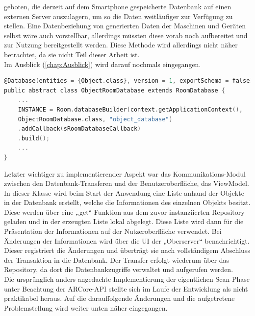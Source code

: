 geboten, die derzeit auf dem Smartphone gespeicherte Datenbank auf einen externen Server auszulagern, um so die Daten weitläufiger zur Verfügung zu stellen. 
Eine Datenbeziehung von generierten Daten der Maschinen und Geräten selbst wäre auch vorstellbar, allerdings müssten diese vorab noch aufbereitet 
und zur Nutzung bereitgestellt werden. Diese Methode wird allerdings nicht näher betrachtet, da sie nicht Teil dieser Arbeit ist. 
\\ 
Im Ausblick (\ref{chap:Ausblick}) wird darauf nochmals eingegangen.
\\ 
\linebreak
\begin{lstlisting}[language=C,
    frame=lines,           % Ein Rahmen um den Code (single for box, lines for top and bottom)
    xleftmargin=\parindent,  % Rahmen link von den Zahlen
    style=algoBericht,
    label={code:dblayer},
    captionpos=b,           % Caption unter den Code setzen
caption={Erzeugung des Datenbank-Layers „Room“}]
@Database(entities = {Object.class}, version = 1, exportSchema = false)
public abstract class ObjectRoomDatabase extends RoomDatabase {
    ...
    INSTANCE = Room.databaseBuilder(context.getApplicationContext(),
    ObjectRoomDatabase.class, "object_database")
    .addCallback(sRoomDatabaseCallback)
    .build();
    ...
}
\end{lstlisting}
Letzter wichtiger zu implementierender Aspekt war das Kommunikations-Modul zwischen den Datenbank-Transferen und der Benutzeroberfläche, das ViewModel. 
In dieser Klasse wird beim Start der Anwendung eine Liste anhand der Objekte in der Datenbank erstellt, welche die Informationen des einzelnen Objekts besitzt. 
Diese werden über eine „get“-Funktion aus dem zuvor instanziierten Repository geladen und in der erzeugten Liste lokal abgelegt. Diese Liste wird dann für 
die Präsentation der Informationen auf der Nutzeroberfläche verwendet. Bei Änderungen der Informationen wird über die \acs{UI} der „Oberserver“ benachrichtigt. 
Dieser registriert die Änderungen und überträgt sie nach vollständigem Abschluss der Transaktion in die Datenbank. Der Transfer erfolgt wiederum über das 
Repository, da dort die Datenbankzugriffe verwaltet und aufgerufen werden. %
\\ 
\linebreak
Die ursprünglich anders angedachte Implementierung der eigentlichen Scan-Phase unter Beachtung der ARCore-\acs{API} stellte sich im Laufe der Entwicklung 
als nicht praktikabel heraus. Auf die darauffolgende Änderungen und die aufgetretene Problemstellung wird weiter unten näher eingegangen. 
